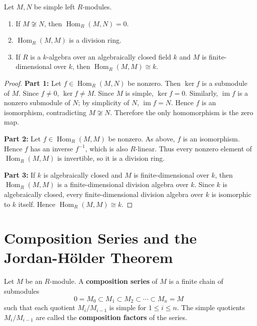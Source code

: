 \begin{lemma}
Let $M, N$ be simple left $R$-modules.
\begin{enumerate}
    \item If $M \not\cong N$, then $\operatorname{Hom}_R(M, N) = 0$.
    \item $\operatorname{Hom}_R(M, M)$ is a division ring.
    \item If $R$ is a $k$-algebra over an algebraically closed field $k$ and $M$ is finite-dimensional over $k$, then $\operatorname{Hom}_R(M, M) \cong k$.
\end{enumerate}
\end{lemma}

\begin{proof}
\textbf{Part 1:} Let $f \in \operatorname{Hom}_R(M, N)$ be nonzero. Then $\ker f$ is a submodule of $M$. Since $f \neq 0$, $\ker f \neq M$. Since $M$ is simple, $\ker f = 0$. Similarly, $\operatorname{im} f$ is a nonzero submodule of $N$; by simplicity of $N$, $\operatorname{im} f = N$. Hence $f$ is an isomorphism, contradicting $M \not\cong N$. Therefore the only homomorphism is the zero map.

\textbf{Part 2:} Let $f \in \operatorname{Hom}_R(M, M)$ be nonzero. As above, $f$ is an isomorphism. Hence $f$ has an inverse $f^{-1}$, which is also $R$-linear. Thus every nonzero element of $\operatorname{Hom}_R(M, M)$ is invertible, so it is a division ring.

\textbf{Part 3:} If \(k\) is algebraically closed and \(M\) is finite-dimensional over \(k\), then \(\operatorname{Hom}_R(M, M)\) is a finite-dimensional division algebra over \(k\). Since \(k\) is algebraically closed, every finite-dimensional division algebra over \(k\) is isomorphic to \(k\) itself. Hence \(\operatorname{Hom}_R(M, M) \cong k\).
\end{proof}

\section{Composition Series and the Jordan-Hölder Theorem}

\begin{defn}
Let $M$ be an $R$-module. A \textbf{composition series} of $M$ is a finite chain of submodules
\[
0 = M_0 \subset M_1 \subset M_2 \subset \cdots \subset M_n = M
\]
such that each quotient $M_i/M_{i-1}$ is simple for $1 \le i \le n$. The simple quotients $M_i/M_{i-1}$ are called the \textbf{composition factors} of the series.
\end{defn}

